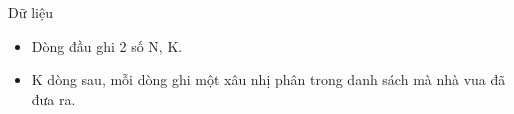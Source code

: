 Dữ liệu
\begin{itemize}
	\item Dòng đầu ghi 2 số N, K.
	\item K dòng sau, mỗi dòng ghi một xâu nhị phân trong danh sách mà nhà vua đã đưa ra.
\end{itemize}